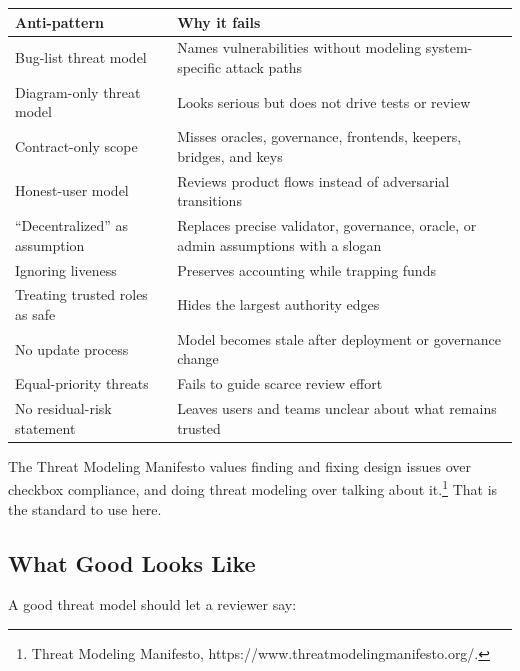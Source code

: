 {\def\LTcaptype{none} %
\begin{longtable}[]{@{}
  >{\raggedright\arraybackslash}p{}
  >{\raggedright\arraybackslash}p{}@{}}
\toprule\noalign{}
\begin{minipage}[b]{\linewidth}\raggedright
Anti-pattern
\end{minipage} & \begin{minipage}[b]{\linewidth}\raggedright
Why it fails
\end{minipage} \\
\midrule\noalign{}
\endhead
\bottomrule\noalign{}
\endlastfoot
Bug-list threat model & Names vulnerabilities without modeling
system-specific attack paths \\
Diagram-only threat model & Looks serious but does not drive tests or
review \\
Contract-only scope & Misses oracles, governance, frontends, keepers,
bridges, and keys \\
Honest-user model & Reviews product flows instead of adversarial
transitions \\
``Decentralized'' as assumption & Replaces precise validator,
governance, oracle, or admin assumptions with a slogan \\
Ignoring liveness & Preserves accounting while trapping funds \\
Treating trusted roles as safe & Hides the largest authority edges \\
No update process & Model becomes stale after deployment or governance
change \\
Equal-priority threats & Fails to guide scarce review effort \\
No residual-risk statement & Leaves users and teams unclear about what
remains trusted \\
\end{longtable}
}

The Threat Modeling Manifesto values finding and fixing design issues
over checkbox compliance, and doing threat modeling over talking about
it.\footnote{Threat Modeling Manifesto,
  https://www.threatmodelingmanifesto.org/.} That is the standard to use
here.

\subsection{What Good Looks Like}

A good threat model should let a reviewer say:

